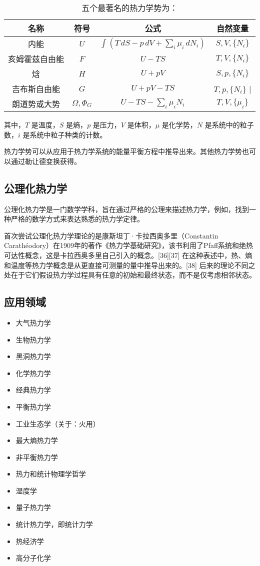 \begin{table}[ht]
\centering
\caption{五个最著名的热力学势为：}\label{RLX1}
\begin{tabular}{|c|c|c|c|}
\hline
\textbf{名称} & \textbf{符号} & \textbf{公式} & \textbf{自然变量} \\
\hline
内能 & \( U \) & \( \int \left( T \, dS - p \, dV + \sum_i \mu_i \, dN_i \right) \)& \( S, V, \{N_i\} \) \\
\hline
亥姆霍兹自由能 & \( F \) & \( U - TS \)& \( T, V, \{N_i\} \) \\
\hline
焓 & \( H \) & \( U + pV \) & \( S, p, \{N_i\} \) \\
\hline
吉布斯自由能 & \( G \) & \( U + pV - TS \) & \( T, p, \{N_i\} \) |\\
\hline
朗道势或大势 & \( \Omega, \Phi_G \) & \( U - TS - \sum_i \mu_i N_i \) & \( T, V, \{\mu_i\} \)\\ 
\hline
\end{tabular}
\end{table}
其中，\( T \) 是温度，\( S \) 是熵，\( p \) 是压力，\( V \) 是体积，\( \mu \) 是化学势，\( N \) 是系统中的粒子数，\( i \) 是系统中粒子种类的计数。

热力学势可以从应用于热力学系统的能量平衡方程中推导出来。其他热力学势也可以通过勒让德变换获得。
\subsection{公理化热力学} 
公理化热力学是一门数学学科，旨在通过严格的公理来描述热力学，例如，找到一种严格的数学方式来表达熟悉的热力学定律。

首次尝试公理化热力学理论的是康斯坦丁·卡拉西奥多里（Constantin Carathéodory）在1909年的著作《热力学基础研究》，该书利用了Pfaff系统和绝热可达性概念，这是卡拉西奥多里自己引入的概念。[36][37] 在这种表述中，热、熵和温度等热力学概念是从更直接可测量的量中推导出来的。[38] 后来的理论不同之处在于它们假设热力学过程具有任意的初始和最终状态，而不是仅考虑相邻状态。
\subsection{应用领域}
\begin{itemize}
\item 大气热力学
\item 生物热力学
\item 黑洞热力学
\item 化学热力学
\item 经典热力学
\item 平衡热力学
\item 工业生态学（关于：火用）
\item 最大熵热力学
\item 非平衡热力学
\item 热力和统计物理学哲学
\item 湿度学
\item 量子热力学
\item 统计热力学，即统计力学
\item 热经济学
\item 高分子化学
\end{itemize}
